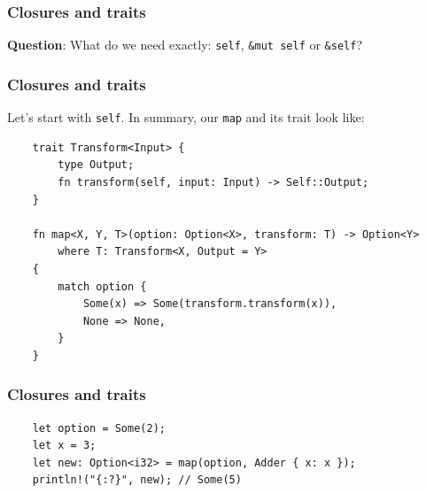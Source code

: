 \documentclass[aspectratio=1610,t]{beamer}
\begin{document}

\begin{frame}[fragile]
\frametitle{Closures and traits}
\textbf{Question}: What do we need exactly: \texttt{self}, \texttt{\&mut self} or \texttt{\&self}?


\end{frame}


\begin{frame}[fragile]
\frametitle{Closures and traits}
Let's start with \texttt{self}. In summary, our \texttt{map} and its trait look like:

\begin{verbatim}
    trait Transform<Input> {
        type Output;
        fn transform(self, input: Input) -> Self::Output;
    }

    fn map<X, Y, T>(option: Option<X>, transform: T) -> Option<Y>
        where T: Transform<X, Output = Y>
    {
        match option {
            Some(x) => Some(transform.transform(x)),
            None => None,
        }
    }
\end{verbatim}
\end{frame}


\begin{frame}[fragile]
\frametitle{Closures and traits}
\begin{verbatim}
    let option = Some(2);
    let x = 3;
    let new: Option<i32> = map(option, Adder { x: x });
    println!("{:?}", new); // Some(5)
\end{verbatim}
\end{frame}
\end{document}
